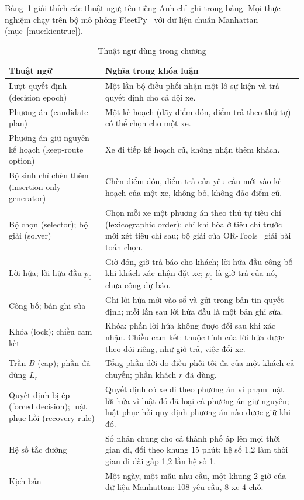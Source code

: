 Bảng~\ref{bang:thuatngu} giải thích các thuật ngữ; tên tiếng Anh chỉ ghi trong bảng. Mọi thực nghiệm chạy trên
bộ mô phỏng FleetPy~\cite{engelhardt2026} với dữ liệu chuẩn Manhattan (mục~\ref{muc:kientruc}).

\begin{table}[htbp]
\centering
\caption{Thuật ngữ dùng trong chương}
\label{bang:thuatngu}
\small
\begin{tabular}{@{}p{4.3cm}p{10.5cm}@{}}
\toprule
\textbf{Thuật ngữ} & \textbf{Nghĩa trong khóa luận}\\
\midrule
Lượt quyết định (decision epoch) & Một lần bộ điều phối nhận một lô sự kiện và trả quyết định cho cả đội xe.\\
Phương án (candidate plan) & Một kế hoạch (dãy điểm đón, điểm trả theo thứ tự) có thể chọn cho một xe.\\
Phương án giữ nguyên kế hoạch (keep-route option) & Xe đi tiếp kế hoạch cũ, không nhận thêm khách.\\
Bộ sinh chỉ chèn thêm (insertion-only generator) & Chèn điểm đón, điểm trả của yêu cầu mới vào kế hoạch của
một xe, không bỏ, không đảo điểm cũ.\\
Bộ chọn (selector); bộ giải (solver) & Chọn mỗi xe một phương án theo thứ tự tiêu chí (lexicographic order):
chỉ khi hòa ở tiêu chí trước mới xét tiêu chí sau; bộ giải của OR-Tools~\cite{ortools} giải bài toán chọn.\\
Lời hứa; lời hứa đầu $p_0$ & Giờ đón, giờ trả báo cho khách; lời hứa đầu công bố khi khách xác nhận đặt xe;
$p_0$ là giờ trả của nó, chưa cộng dự báo.\\
Công bố; bản ghi sửa & Ghi lời hứa mới vào sổ và gửi trong bản tin quyết định; mỗi lần sau lời hứa đầu là một
bản ghi sửa.\\
Khóa (lock); chiều cam kết & Khóa: phần lời hứa không được đổi sau khi xác nhận. Chiều cam kết: thuộc tính của
lời hứa được theo dõi riêng, như giờ trả, việc đổi xe.\\
Trần $B$ (cap); phần đã dùng $L_r$ & Tổng phần dời do điều phối tối đa của một khách cả chuyến; phần khách $r$
đã dùng.\\
Quyết định bị ép (forced decision); luật phục hồi (recovery rule) & Quyết định có xe đi theo phương án vi phạm
luật lời hứa vì luật đó đã loại cả phương án giữ nguyên; luật phục hồi quy định phương án nào được giữ khi đó.\\
Hệ số tắc đường & Số nhân chung cho cả thành phố áp lên mọi thời gian đi, đổi theo khung 15 phút; hệ số 1,2 làm
thời gian đi dài gấp 1,2 lần hệ số 1.\\
Kịch bản & Một ngày, một mẫu nhu cầu, một khung 2 giờ của dữ liệu Manhattan: 108 yêu cầu, 8 xe 4 chỗ.\\
\bottomrule
\end{tabular}
\end{table}

